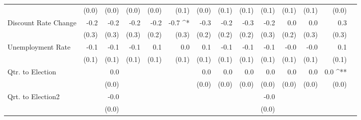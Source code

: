\documentclass[a4paper]{article}\usepackage{graphicx, color}
\begin{document}
\begin{table}[ht]
\begin{center}
{\begin{tabular}{ l D{.}{.}{1}D{.}{.}{1}D{.}{.}{1}D{.}{.}{1}D{.}{.}{1}D{.}{.}{1}D{.}{.}{1}D{.}{.}{1}D{.}{.}{1}D{.}{.}{1}D{.}{.}{1}D{.}{.}{1}D{.}{.}{1} }
                     & (0.0)           & (0.0)           & (0.0)           & (0.0)           & (0.1)           & (0.0)           & (0.1)           & (0.1)           & (0.1)           & (0.1)           & (0.1)           & (0.0)           &                \\ 
Discount Rate Change & -0.2            & -0.2            & -0.2            & -0.2            & -0.7 ^*         & -0.3            & -0.2            & -0.3            & -0.2            & 0.0             & 0.0             & 0.3             &                \\ 
                     & (0.3)           & (0.3)           & (0.3)           & (0.2)           & (0.3)           & (0.2)           & (0.2)           & (0.2)           & (0.3)           & (0.2)           & (0.3)           & (0.3)           &                \\ 
Unemployment Rate    & -0.1            & -0.1            & -0.1            & 0.1             & 0.0             & 0.1             & -0.1            & -0.1            & -0.1            & -0.0            & -0.0            & 0.1             &                \\ 
                     & (0.1)           & (0.1)           & (0.1)           & (0.1)           & (0.1)           & (0.1)           & (0.1)           & (0.1)           & (0.1)           & (0.1)           & (0.1)           & (0.1)           &                \\ 
Qtr. to Election     &                 & 0.0             &                 &                 &                 & 0.0             & 0.0             & 0.0             & 0.0             & 0.0             & 0.0             & 0.0 ^{**}       &                \\ 
                     &                 & (0.0)           &                 &                 &                 & (0.0)           & (0.0)           & (0.0)           & (0.0)           & (0.0)           & (0.0)           & (0.0)           &                \\ 
Qrt. to Election2    &                 & -0.0            &                 &                 &                 &                 &                 &                 & -0.0            &                 &                 &                 &                \\ 
                     &                 & (0.0)           &                 &                 &                 &                 &                 &                 & (0.0)           &                 &                 &                 &                \\ 

\end{tabular}}
\end{center}
\end{table}
\end{document}
